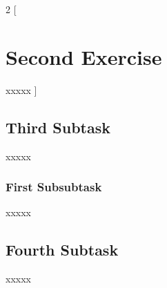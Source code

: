 \documentclass[a4paper, 11pt]{article} %
\begin{document}
\bigskip


\begin{multicols}{2}
    [
        \section{Second Exercise}
        xxxxx
    ]

    \subsection{Third Subtask}
    xxxxx

    \subsubsection{First Subsubtask}
    xxxxx

    \subsection{Fourth Subtask}
    xxxxx

\end{multicols}

\bigskip



\end{document}
